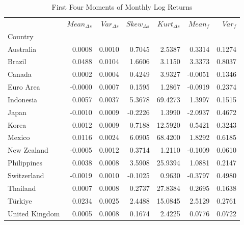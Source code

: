 \documentclass[a4paper,10pt,final]{article}    %
\begin{document}
\begin{table}[htbp]
    \centering
    \caption{First Four Moments of Monthly Log Returns}
    \label{tab:desc_stats}
    \begin{tabular}{lrrrrrr}
        \toprule
                       & $Mean_{\Delta s}$ & $Var_{\Delta s}$ & $Skew_{\Delta s}$ & $Kurt_{\Delta s}$ & $Mean_{f}$ & $Var_{f}$ \\
        Country        &                   &                  &                   &                   &            &           \\
        \midrule
        Australia      & 0.0008            & 0.0010           & 0.7045            & 2.5387            & 0.3314     & 0.1274    \\
        Brazil         & 0.0488            & 0.0104           & 1.6606            & 3.1150            & 3.3373     & 0.8037    \\
        Canada         & 0.0002            & 0.0004           & 0.4249            & 3.9327            & -0.0051    & 0.1346    \\
        Euro Area      & -0.0000           & 0.0007           & 0.1595            & 1.2867            & -0.0919    & 0.2374    \\
        Indonesia      & 0.0057            & 0.0037           & 5.3678            & 69.4273           & 1.3997     & 0.1515    \\
        Japan          & -0.0010           & 0.0009           & -0.2226           & 1.3990            & -2.0937    & 0.4672    \\
        Korea          & 0.0012            & 0.0009           & 0.7188            & 12.5920           & 0.5421     & 0.3243    \\
        Mexico         & 0.0116            & 0.0024           & 6.0905            & 68.4200           & 1.8292     & 0.6185    \\
        New Zealand    & -0.0005           & 0.0012           & 0.3714            & 1.2110            & -0.1009    & 0.0610    \\
        Philippines    & 0.0038            & 0.0008           & 3.5908            & 25.9394           & 1.0881     & 0.2147    \\
        Switzerland    & -0.0019           & 0.0010           & -0.1025           & 0.9630            & -0.3797    & 0.4980    \\
        Thailand       & 0.0007            & 0.0008           & 0.2737            & 27.8384           & 0.2695     & 0.1638    \\
        Türkiye        & 0.0234            & 0.0025           & 2.4488            & 15.0845           & 2.5129     & 0.2761    \\
        United Kingdom & 0.0005            & 0.0008           & 0.1674            & 2.4225            & 0.0776     & 0.0722    \\
        \bottomrule
    \end{tabular}
\end{table}
\end{document}
